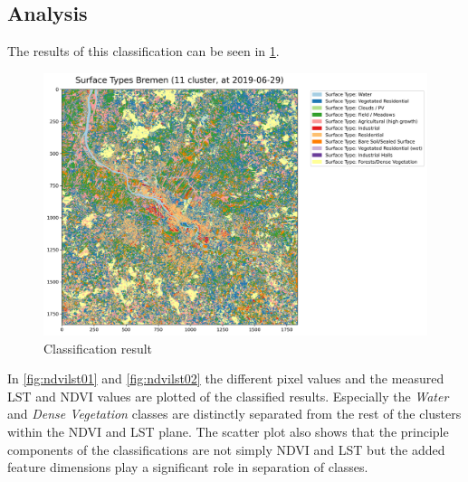 \documentclass[12pt,a4paper, english,twoside]{scrartcl}
\begin{document}
    \subsection{Analysis}\label{sec:landcoverAnalysis} 
      The results of this classification can be seen in \cref{fig:classification}. \\ 
      \begin{figure}[!htbp]
       \begin{center}
         \includegraphics[width=\textwidth]{img/Classification.png}
       \end{center}
       \caption{Classification result}\label{fig:classification}
      \end{figure}
    In \cref{fig:ndvilst01} and \cref{fig:ndvilst02} the different pixel values and the measured \gls{LST} and \gls{NDVI} values are plotted of the classified results. 
    Especially the \textit{Water} and \textit{Dense Vegetation} classes are distinctly separated from the rest of the clusters within the \gls{NDVI} and \gls{LST} plane. 
      The scatter plot also shows that the principle components of the classifications are not simply \gls{NDVI} and \gls{LST} but the added feature dimensions play a significant role in separation of classes.\\
\end{document}
